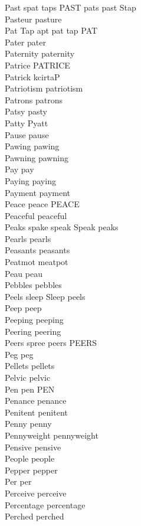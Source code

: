 Past spat taps PAST pats past Stap\\
Pasteur pasture\\
Pat Tap apt pat tap PAT\\
Pater pater\\
Paternity paternity\\
Patrice PATRICE\\
Patrick kcirtaP\\
Patriotism patriotism\\
Patrons patrons\\
Patsy pasty\\
Patty Pyatt\\
Pause pause\\
Pawing pawing\\
Pawning pawning\\
Pay pay\\
Paying paying\\
Payment payment\\
Peace peace PEACE\\
Peaceful peaceful\\
Peaks spake speak Speak peaks\\
Pearls pearls\\
Peasants peasants\\
Peatmot meatpot\\
Peau peau\\
Pebbles pebbles\\
Peels sleep Sleep peels\\
Peep peep\\
Peeping peeping\\
Peering peering\\
Peers spree peers PEERS\\
Peg peg\\
Pellets pellets\\
Pelvic pelvic\\
Pen pen PEN\\
Penance penance\\
Penitent penitent\\
Penny penny\\
Pennyweight pennyweight\\
Pensive pensive\\
People people\\
Pepper pepper\\
Per per\\
Perceive perceive\\
Percentage percentage\\
Perched perched\\
